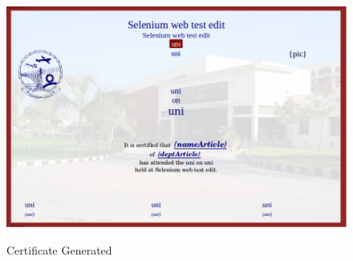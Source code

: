 \begin{figure}[!ht]
\centering
\includegraphics[width=0.8\linewidth]{input/images/se5.png}
\label{fig:image1}
\caption{Certificate Generated}
\end{figure}

